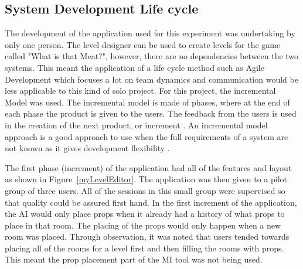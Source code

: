 \documentclass[journal]{IEEEtran}
\begin{document}
\subsection{System Development Life cycle}
The development of the application used for this experiment was undertaking by only one person. The level designer can be used to create levels for the game called "What is that Meat?", however, there are no dependencies between the two systems. This meant the application of a life cycle method such as Agile Development which focuses a lot on team dynamics and communication\cite{agile} would be less applicable to this kind of solo project. For this project, the incremental Model was used. The incremental model is made of phases, where at the end of each phase the product is given to the users. The feedback from the users is used in the creation of the next product, or increment \cite{massey2012comparing}. An incremental model approach is a good approach to use when the full requirements of a system are not known as it gives development flexibility \cite{isaias2015information}. 

The first phase (increment) of the application had all of the features and layout as shown in Figure~\ref{myLevelEditor}. The application was then given to a pilot group of three users. All of the sessions in this small group were supervised so that quality could be assured first hand. In the first increment of the application, the AI would only place props when it already had a history of what props to place in that room. The placing of the props would only happen when a new room was placed. Through observation, it was noted that users tended towards placing all of the rooms for a level first and then filling the rooms with props. This meant the prop placement part of the MI tool was not being used. 
\end{document}
